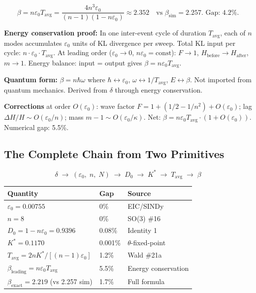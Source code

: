 \documentclass[12pt, a4paper]{article}
\begin{document}
\begin{derivedbox}[title={$\beta = n\varepsilon_0 T_{\mathrm{avg}}$ --- Energy Conservation (5.5\%)}]
\[
\beta = n\varepsilon_0 T_{\mathrm{avg}} = \frac{4n^3\varepsilon_0}{(n-1)(1-n\varepsilon_0)}
\approx 2.352 \quad \text{vs } \beta_{\mathrm{sim}} = 2.257. \text{ Gap: } 4.2\%.
\]

\textbf{Energy conservation proof:} In one inter-event cycle of duration $T_{\mathrm{avg}}$,
each of $n$ modes accumulates $\varepsilon_0$ units of KL divergence per sweep.
Total KL input per cycle: $n \cdot \varepsilon_0 \cdot T_{\mathrm{avg}}$.
At leading order ($\varepsilon_0 \to 0$, $n\varepsilon_0 = \mathrm{const}$):
$F \to 1$, $H_{\mathrm{before}} \to H_{\mathrm{after}}$, $m \to 1$.
Energy balance: input = output gives $\beta = n\varepsilon_0 T_{\mathrm{avg}}$.

\textbf{Quantum form:} $\beta = n\hbar\omega$ where $\hbar \leftrightarrow \varepsilon_0$,
$\omega \leftrightarrow 1/T_{\mathrm{avg}}$, $E \leftrightarrow \beta$.
Not imported from quantum mechanics. Derived from $\delta$ through energy conservation.

\textbf{Corrections} at order $O(\varepsilon_0)$: wave factor $F = 1 + (1/2 - 1/n^2) + O(\varepsilon_0)$;
lag $\Delta H/H \sim O(\varepsilon_0/n)$; mass $m-1 \sim O(\varepsilon_0/\kappa)$.
Net: $\beta = n\varepsilon_0 T_{\mathrm{avg}} \cdot (1 + O(\varepsilon_0))$. Numerical gap: 5.5\%.
\end{derivedbox}

\subsection{The Complete Chain from Two Primitives}

\begin{keybox}[title={Complete Chain: $(\varepsilon_0, n, N) \to$ Everything}]
\[
\delta \;\to\; (\varepsilon_0,\; n,\; N) \;\to\; D_0 \;\to\; K^* \;\to\; T_{\mathrm{avg}} \;\to\; \beta
\]

\begin{center}
\renewcommand{\arraystretch}{1.35}
\begin{tabular}{p{5.5cm} p{1.8cm} p{5cm}}
\toprule
\textbf{Quantity} & \textbf{Gap} & \textbf{Source} \\
\midrule
$\varepsilon_0 = 0.00755$ & 0\% & EIC/SINDy \\
$n = 8$ & 0\% & SO(3) \#16 \\
$D_0 = 1 - n\varepsilon_0 = 0.9396$ & 0.08\% & Identity 1 \\
$K^* = 0.1170$ & 0.001\% & $\theta$-fixed-point \\
$T_{\mathrm{avg}} = 2nK^*/[(n-1)\varepsilon_0]$ & 1.2\% & Wald \#21a \\
$\beta_{\mathrm{leading}} = n\varepsilon_0 T_{\mathrm{avg}}$ & 5.5\% & Energy conservation \\
$\beta_{\mathrm{exact}} = 2.219$ (vs 2.257 sim) & 1.7\% & Full formula \\
\bottomrule
\end{tabular}
\end{center}
\end{keybox}
\end{document}
